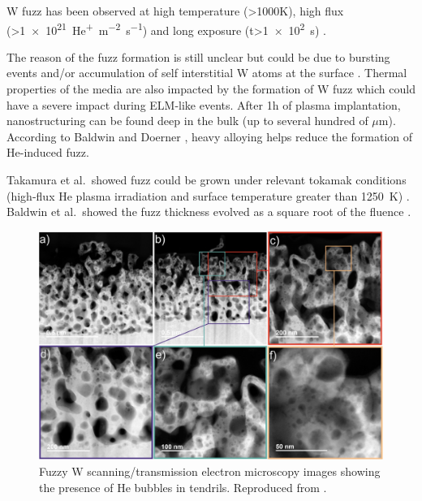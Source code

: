 W \gls{fuzz} has been observed at high temperature (>1000K), high flux (>\SI{1e21}{He^+.m^{-2}.s^{-1}}) and long exposure (t>\SI{1e2}{s}) .

The reason of the \gls{fuzz} formation is still unclear but could be due to bursting events and/or accumulation of self interstitial W atoms at the surface .
Thermal properties of the media are also impacted by the formation of \gls{W} \gls{fuzz}  which could have a severe impact during ELM-like events.
After 1h of \gls{plasma} implantation, nanostructuring can be found deep in the bulk (up to several hundred of $\mu$m).
According to Baldwin and Doerner , heavy alloying helps reduce the formation of He-induced \gls{fuzz}.

Takamura et al.\ showed \gls{fuzz} could be grown under relevant \gls{tokamak} conditions (high-flux \gls{He} \gls{plasma} irradiation and surface temperature greater than \SI{1250}{K}) .
Baldwin et al.\ showed the \gls{fuzz} thickness evolved as a square root of the \gls{fluence} \cite{baldwin_effects_2009}.

\begin{figure} [h!]
    \centering
    \includegraphics[width=\linewidth]{Figures/Chapter1/fuzz_mccarthy.jpg}
    \caption{Fuzzy W scanning/transmission electron microscopy images showing the presence of He bubbles in tendrils. Reproduced from \cite{mccarthy_enhanced_2020}.}
\end{figure}

